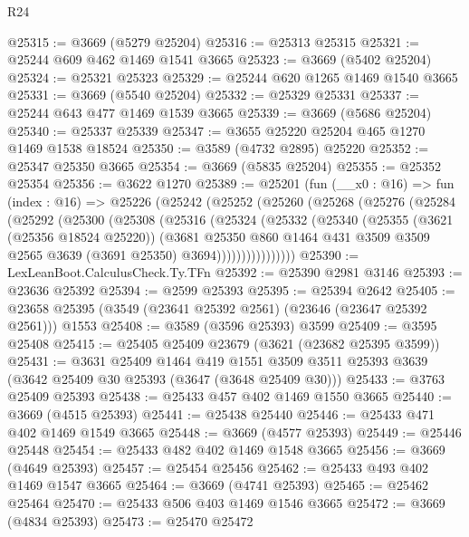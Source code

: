\begin{lexlean}{R24}
\begin{coremodule}
@25315 := @3669 (@5279 @25204)
@25316 := @25313 @25315
@25321 := @25244 @609 @462 @1469 @1541 @3665
@25323 := @3669 (@5402 @25204)
@25324 := @25321 @25323
@25329 := @25244 @620 @1265 @1469 @1540 @3665
@25331 := @3669 (@5540 @25204)
@25332 := @25329 @25331
@25337 := @25244 @643 @477 @1469 @1539 @3665
@25339 := @3669 (@5686 @25204)
@25340 := @25337 @25339
@25347 := @3655 @25220 @25204 @465 @1270 @1469 @1538 @18524
@25350 := @3589 (@4732 @2895) @25220
@25352 := @25347 @25350 @3665
@25354 := @3669 (@5835 @25204)
@25355 := @25352 @25354
@25356 := @3622 @1270
@25389 := @25201
    (fun (__x0 : @16) =>
    fun (index : @16) =>
    @25226
      (@25242
        (@25252
          (@25260
            (@25268
              (@25276
                (@25284
                  (@25292
                    (@25300
                      (@25308
                        (@25316
                          (@25324
                            (@25332
                              (@25340
                                (@25355
                                  (@3621 (@25356 @18524 @25220))
                                  (@3681
                                    @25350
                                    @860
                                    @1464
                                    @431
                                    @3509
                                    @3509
                                    @2565
                                    @3639
                                    (@3691 @25350)
                                    @3694))))))))))))))))
@25390 := LexLeanBoot.CalculusCheck.Ty.TFn
@25392 := @25390 @2981 @3146
@25393 := @23636 @25392
@25394 := @2599 @25393
@25395 := @25394 @2642
@25405 := @23658 @25395 (@3549 (@23641 @25392 @2561) (@23646 (@23647 @25392 @2561))) @1553
@25408 := @3589 (@3596 @25393) @3599
@25409 := @3595 @25408
@25415 := @25405 @25409 @23679 (@3621 (@23682 @25395 @3599))
@25431 := @3631
    @25409
    @1464
    @419
    @1551
    @3509
    @3511
    @25393
    @3639
    (@3642 @25409 @30 @25393 (@3647 (@3648 @25409 @30)))
@25433 := @3763 @25409 @25393
@25438 := @25433 @457 @402 @1469 @1550 @3665
@25440 := @3669 (@4515 @25393)
@25441 := @25438 @25440
@25446 := @25433 @471 @402 @1469 @1549 @3665
@25448 := @3669 (@4577 @25393)
@25449 := @25446 @25448
@25454 := @25433 @482 @402 @1469 @1548 @3665
@25456 := @3669 (@4649 @25393)
@25457 := @25454 @25456
@25462 := @25433 @493 @402 @1469 @1547 @3665
@25464 := @3669 (@4741 @25393)
@25465 := @25462 @25464
@25470 := @25433 @506 @403 @1469 @1546 @3665
@25472 := @3669 (@4834 @25393)
@25473 := @25470 @25472

\end{coremodule}
\end{lexlean}
